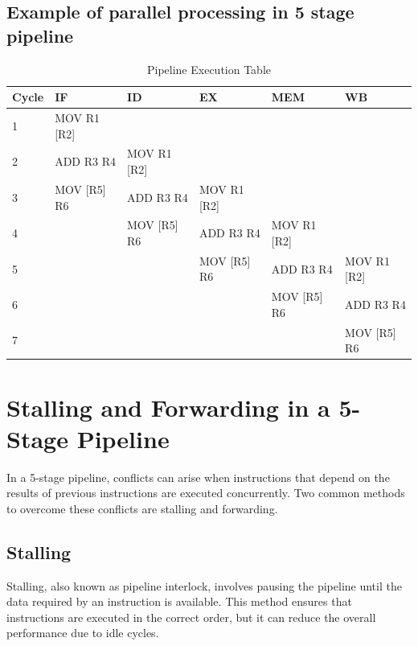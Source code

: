 \documentclass{report}
\begin{document}
\subsection{Example of parallel processing in 5 stage pipeline}

\begin{table}[h!]
	\centering
	\begin{tabularx}{\textwidth}{@{}l*{5}{>{\centering\arraybackslash}X}@{}}
		\toprule
		\textbf{Cycle} & \textbf{IF} & \textbf{ID} & \textbf{EX} & \textbf{MEM} & \textbf{WB} \\
		\midrule
		1              & MOV R1 [R2] &             &             &              &             \\
		2              & ADD R3 R4   & MOV R1 [R2] &             &              &             \\
		3              & MOV [R5] R6 & ADD R3 R4   & MOV R1 [R2] &              &             \\
		4              &             & MOV [R5] R6 & ADD R3 R4   & MOV R1 [R2]  &             \\
		5              &             &             & MOV [R5] R6 & ADD R3 R4    & MOV R1 [R2] \\
		6              &             &             &             & MOV [R5] R6  & ADD R3 R4   \\
		7              &             &             &             &              & MOV [R5] R6 \\
		\bottomrule
	\end{tabularx}
	\caption{Pipeline Execution Table}
\end{table}

\section{Stalling and Forwarding in a 5-Stage Pipeline}

In a 5-stage pipeline, conflicts can arise when instructions that depend on the results of previous instructions are executed concurrently. Two common methods to overcome these conflicts are stalling and forwarding.

\subsection{Stalling}

Stalling, also known as pipeline interlock, involves pausing the pipeline until the data required by an instruction is available. This method ensures that instructions are executed in the correct order, but it can reduce the overall performance due to idle cycles.
\end{document}
